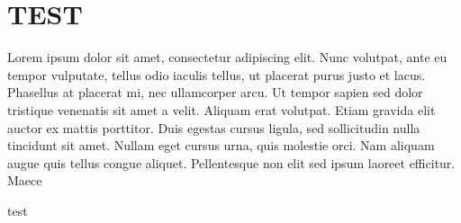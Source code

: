 \newpage
\tableofcontents


\newpage
{} 

\section{TEST}

Lorem ipsum dolor sit amet, consectetur adipiscing elit. Nunc volutpat, ante eu tempor vulputate, tellus odio iaculis tellus, ut placerat purus justo et lacus. Phasellus at placerat mi, nec ullamcorper arcu. Ut tempor sapien sed dolor tristique venenatis sit amet a velit. Aliquam erat volutpat. Etiam gravida elit auctor ex mattis porttitor. Duis egestas cursus ligula, sed sollicitudin nulla tincidunt sit amet. Nullam eget cursus urna, quis molestie orci. Nam aliquam augue quis tellus congue aliquet. Pellentesque non elit sed ipsum laoreet efficitur. Maece

\vspace{\baselineskip}


test
